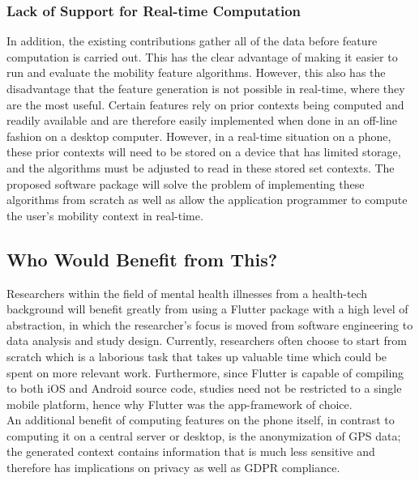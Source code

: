 \subsubsection*{Lack of Support for Real-time Computation}
In addition, the existing contributions gather all of the data before feature computation is carried out. This has the clear advantage of making it easier to run and evaluate the mobility feature algorithms. However, this also has the disadvantage that the feature generation is not possible in real-time, where they are the most useful. Certain features rely on prior contexts being computed and readily available and are therefore easily implemented when done in an off-line fashion on a desktop computer. However, in a real-time situation on a phone, these prior contexts will need to be stored on a device that has limited storage, and the algorithms must be adjusted to read in these stored set contexts. The proposed software package will solve the problem of implementing these algorithms from scratch as well as allow the application programmer to compute the user's mobility context in real-time.

\subsection*{Who Would Benefit from This?}
Researchers within the field of mental health illnesses from a health-tech background will benefit greatly from using a Flutter package with a high level of abstraction, in which the researcher's focus is moved from software engineering to data analysis and study design. Currently, researchers often choose to start from scratch which is a laborious task that takes up valuable time which could be spent on more relevant work. Furthermore, since Flutter is capable of compiling to both iOS and Android source code, studies need not be restricted to a single mobile platform, hence why Flutter was the app-framework of choice.\\

An additional benefit of computing features on the phone itself, in contrast to computing it on a central server or desktop, is the anonymization of GPS data; the generated context contains information that is much less sensitive and therefore has implications on privacy as well as GDPR compliance.


